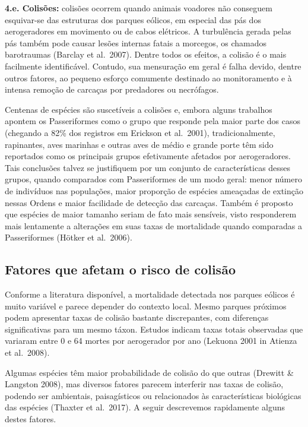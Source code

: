 \documentclass[
]{scrbook}
\begin{document}
\textbf{4.e. Colisões:} colisões ocorrem quando animais voadores não conseguem esquivar-se das estruturas dos parques eólicos, em especial das pás dos aerogeradores em movimento ou de cabos elétricos. A turbulência gerada pelas pás também pode causar lesões internas fatais a morcegos, os chamados barotraumas (Barclay et al.~2007). Dentre todos os efeitos, a colisão é o mais facilmente identificável. Contudo, sua mensuração em geral é falha devido, dentre outros fatores, ao pequeno esforço comumente destinado ao monitoramento e à intensa remoção de carcaças por predadores ou necrófagos.

Centenas de espécies são suscetíveis a colisões e, embora alguns trabalhos apontem os Passeriformes como o grupo que responde pela maior parte dos casos (chegando a 82\% dos registros em Erickson et al.~2001), tradicionalmente, rapinantes, aves marinhas e outras aves de médio e grande porte têm sido reportados como os principais grupos efetivamente afetados por aerogeradores. Tais conclusões talvez se justifiquem por um conjunto de características desses grupos, quando comparados com Passeriformes de um modo geral: menor número de indivíduos nas populações, maior proporção de espécies ameaçadas de extinção nessas Ordens e maior facilidade de detecção das carcaças. Também é proposto que espécies de maior tamanho seriam de fato mais sensíveis, visto responderem mais lentamente a alterações em suas taxas de mortalidade quando comparadas a Passeriformes (Hötker et al.~2006).

\hypertarget{fatores}{%
\subsection{Fatores que afetam o risco de colisão}\label{fatores}}

Conforme a literatura disponível, a mortalidade detectada nos parques eólicos é muito variável e parece depender do contexto local. Mesmo parques próximos podem apresentar taxas de colisão bastante discrepantes, com diferenças significativas para um mesmo táxon. Estudos indicam taxas totais observadas que variaram entre 0 e 64 mortes por aerogerador por ano (Lekuona 2001 in Atienza et al.~2008).

Algumas espécies têm maior probabilidade de colisão do que outras (Drewitt \& Langston 2008), mas diversos fatores parecem interferir nas taxas de colisão, podendo ser ambientais, paisagísticos ou relacionados às características biológicas das espécies (Thaxter et al.~2017). A seguir descrevemos rapidamente alguns destes fatores.
\end{document}
